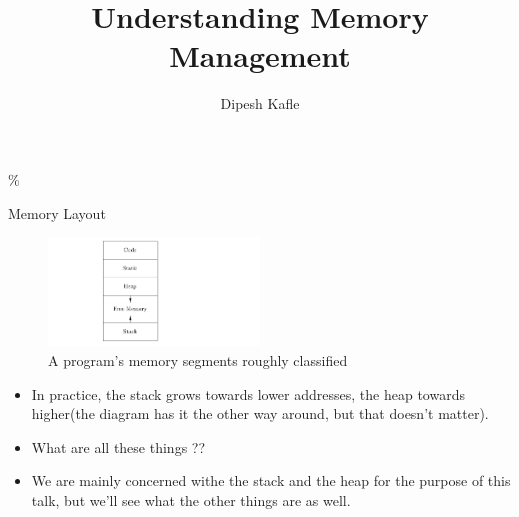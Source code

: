 \documentclass[
  10pt,
  ignorenonframetext,
]{beamer}
\title{Understanding Memory Management}
\author{Dipesh Kafle}
\date{}
\providecommand{\tightlist}{%
  \setlength{\itemsep}{0pt}\setlength{\parskip}{0pt}}
\begin{document}
\frame{\titlepage}

\begin{frame}
\setsansfont[ItalicFont={Fira Sans Light Italic},%
BoldFont={Fira Sans SemiBold},%
BoldItalicFont={Fira Sans Italic}]%
{Fira Sans Light}\%
\end{frame}

\begin{frame}{Memory Layout}
\protect\hypertarget{memory-layout}{}
\begin{figure}
\centering
\includegraphics[width=0.5\textwidth,height=\textheight]{images/memory.png}
\caption{A program's memory segments roughly
classified}
\end{figure}

\begin{itemize}
\tightlist
\item
  In practice, the stack grows towards lower
  addresses, the heap towards higher(the diagram
  has it the other way around, but that doesn't
  matter).
\end{itemize}

\pause

\begin{itemize}
\tightlist
\item
  What are all these things ??
\end{itemize}

\pause

\begin{itemize}
\tightlist
\item
  We are mainly concerned withe the stack and the
  heap for the purpose of this talk, but we'll see
  what the other things are as well.
\end{itemize}
\end{frame}
\end{document}

